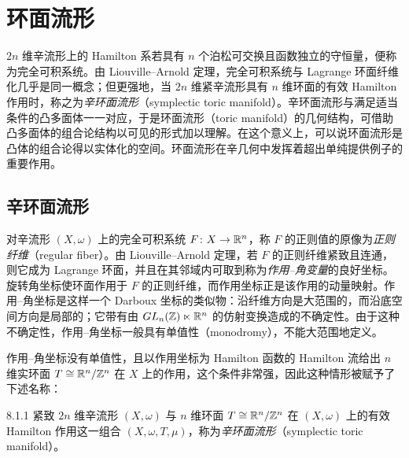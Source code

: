 \chapter{环面流形}

$2n$ 维辛流形上的 Hamilton 系若具有 $n$ 个泊松可交换且函数独立的守恒量，便称为完全可积系统。由 Liouville--Arnold 定理，完全可积系统与 Lagrange 环面纤维化几乎是同一概念；但更强地，当 $2n$ 维紧辛流形具有 $n$ 维环面的有效 Hamilton 作用时，称之为\emph{辛环面流形}（symplectic toric manifold）。辛环面流形与满足适当条件的凸多面体一一对应，于是环面流形（toric manifold）的几何结构，可借助凸多面体的组合论结构以可见的形式加以理解。在这个意义上，可以说环面流形是凸体的组合论得以实体化的空间。环面流形在辛几何中发挥着超出单纯提供例子的重要作用。


\section{辛环面流形}

对辛流形 $(X,\omega)$ 上的完全可积系统 $F\colon X\to\mathbb{R}^n$，称 $F$ 的正则值的原像为\emph{正则纤维}（regular fiber）。由 Liouville--Arnold 定理，若 $F$ 的正则纤维紧致且连通，则它成为 Lagrange 环面，并且在其邻域内可取到称为\emph{作用--角变量}的良好坐标。旋转角坐标使环面作用于 $F$ 的正则纤维，而作用坐标正是该作用的动量映射。作用--角坐标是这样一个 Darboux 坐标的类似物：沿纤维方向是大范围的，而沿底空间方向是局部的；它带有由 $GL_n(\mathbb{Z})\ltimes\mathbb{R}^n$ 的仿射变换造成的不确定性。由于这种不确定性，作用--角坐标一般具有单值性（monodromy），不能大范围地定义。


作用--角坐标没有单值性，且以作用坐标为 Hamilton 函数的 Hamilton 流给出 $n$ 维实环面 $T\cong\mathbb{R}^n/\mathbb{Z}^n$ 在 $X$ 上的作用，这个条件非常强，因此这种情形被赋予了下述名称：

\begin{definition}{8.1.1}
  紧致 $2n$ 维辛流形 $(X,\omega)$ 与 $n$ 维环面 $T\cong\mathbb{R}^n/\mathbb{Z}^n$ 在 $(X,\omega)$ 上的有效 Hamilton 作用这一组合 $(X,\omega,T,\mu)$，称为\emph{辛环面流形}（symplectic toric manifold）。
\end{definition}

